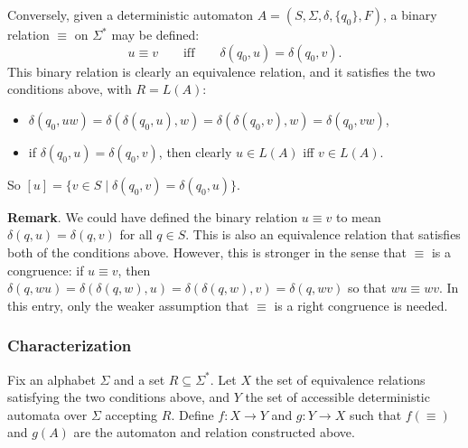 \documentclass[12pt]{article}
\begin{document}
Conversely, given a deterministic automaton $A=(S,\Sigma,\delta,\lbrace q_0\rbrace,F)$, a binary relation $\equiv$ on $\Sigma^*$ may be defined:
$$u\equiv v\qquad \mbox{iff} \qquad \delta(q_0,u)=\delta(q_0,v).$$
This binary relation is clearly an equivalence relation, and it satisfies the two conditions above, with $R=L(A)$: 
\begin{itemize}
\item $\delta(q_0,uw)=\delta(\delta(q_0,u),w)= \delta(\delta(q_0,v),w)=\delta(q_0,vw)$,
\item if $\delta(q_0,u)=\delta(q_0,v)$, then clearly $u\in L(A)$ iff $v\in L(A)$.
\end{itemize}
So $[u]=\lbrace v \in S \mid \delta(q_0,v)=\delta(q_0,u)\rbrace$.

\textbf{Remark}.  We could have defined the binary relation $u \equiv v$ to mean $\delta(q,u)=\delta(q,v)$ for all $q\in S$.  This is also an equivalence relation that satisfies both of the conditions above.  However, this is stronger in the sense that $\equiv$ is a congruence: if $u\equiv v$, then $\delta(q,wu)=\delta(\delta(q,w),u)=\delta( \delta(q,w),v) = \delta(q,wv)$ so that $wu\equiv wv$.  In this entry, only the weaker assumption that $\equiv$ is a right congruence is needed.

\subsubsection*{Characterization}

Fix an alphabet $\Sigma$ and a set $R\subseteq \Sigma^*$.  Let $X$ the set of equivalence relations satisfying the two conditions above, and $Y$ the set of accessible deterministic automata over $\Sigma$ accepting $R$.  Define $f:X\to Y$ and $g:Y\to X$ such that $f(\equiv)$ and $g(A)$ are the automaton and relation constructed above.
\end{document}
